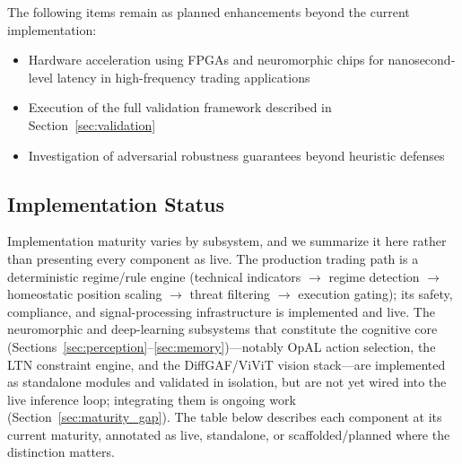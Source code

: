 \documentclass[12pt, a4paper]{article}
\begin{document}
The following items remain as planned enhancements beyond the current implementation:

\begin{itemize}
	\item Hardware acceleration using FPGAs \citep{marino2023mevit, vemeko2023fpga, amd2023alveo} and neuromorphic chips for nanosecond-level latency in high-frequency trading applications
	\item Execution of the full validation framework described in Section~\ref{sec:validation}
	\item Investigation of adversarial robustness guarantees beyond heuristic defenses
\end{itemize}

\subsection{Implementation Status}
\label{sec:implementation_status}

Implementation maturity varies by subsystem, and we summarize it here rather than presenting every component as live. The production trading path is a deterministic regime/rule engine (technical indicators $\rightarrow$ regime detection $\rightarrow$ homeostatic position scaling $\rightarrow$ threat filtering $\rightarrow$ execution gating); its safety, compliance, and signal-processing infrastructure is implemented and live. The neuromorphic and deep-learning subsystems that constitute the cognitive core (Sections~\ref{sec:perception}--\ref{sec:memory})---notably OpAL action selection, the LTN constraint engine, and the DiffGAF/ViViT vision stack---are implemented as standalone modules and validated in isolation, but are not yet wired into the live inference loop; integrating them is ongoing work (Section~\ref{sec:maturity_gap}). The table below describes each component at its current maturity, annotated as live, standalone, or scaffolded/planned where the distinction matters.
\end{document}
